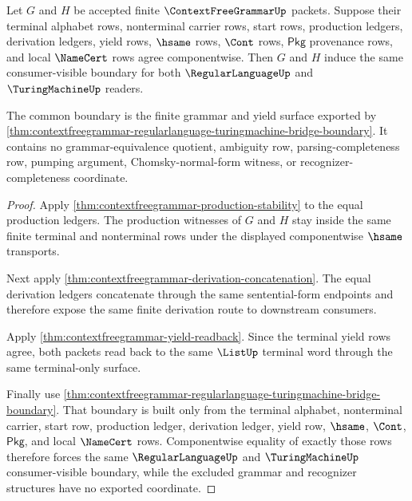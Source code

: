 \begin{theorem}
\label{thm:contextfreegrammar-consumer-boundary-determinacy}
Let $G$ and $H$ be accepted finite $\ContextFreeGrammarUp$ packets. Suppose
their terminal alphabet rows, nonterminal carrier rows, start rows, production
ledgers, derivation ledgers, yield rows, $\hsame$ rows, $\Cont$ rows,
$\mathsf{Pkg}$ provenance rows, and local $\NameCert$ rows agree
componentwise. Then $G$ and $H$ induce the same consumer-visible boundary for
both $\RegularLanguageUp$ and $\TuringMachineUp$ readers.

The common boundary is the finite grammar and yield surface exported by
\autoref{thm:contextfreegrammar-regularlanguage-turingmachine-bridge-boundary}.
It contains no grammar-equivalence quotient, ambiguity row, parsing-completeness
row, pumping argument, Chomsky-normal-form witness, or recognizer-completeness
coordinate.
\end{theorem}
\begin{proof}
Apply \autoref{thm:contextfreegrammar-production-stability} to the equal
production ledgers. The production witnesses of $G$ and $H$ stay inside the
same finite terminal and nonterminal rows under the displayed componentwise
$\hsame$ transports.

Next apply \autoref{thm:contextfreegrammar-derivation-concatenation}. The
equal derivation ledgers concatenate through the same sentential-form endpoints
and therefore expose the same finite derivation route to downstream consumers.

Apply \autoref{thm:contextfreegrammar-yield-readback}. Since the terminal yield
rows agree, both packets read back to the same $\ListUp$ terminal word through
the same terminal-only surface.

Finally use
\autoref{thm:contextfreegrammar-regularlanguage-turingmachine-bridge-boundary}.
That boundary is built only from the terminal alphabet, nonterminal carrier,
start row, production ledger, derivation ledger, yield row, $\hsame$, $\Cont$,
$\mathsf{Pkg}$, and local $\NameCert$ rows. Componentwise equality of exactly
those rows therefore forces the same $\RegularLanguageUp$ and
$\TuringMachineUp$ consumer-visible boundary, while the excluded grammar and
recognizer structures have no exported coordinate.
\end{proof}

